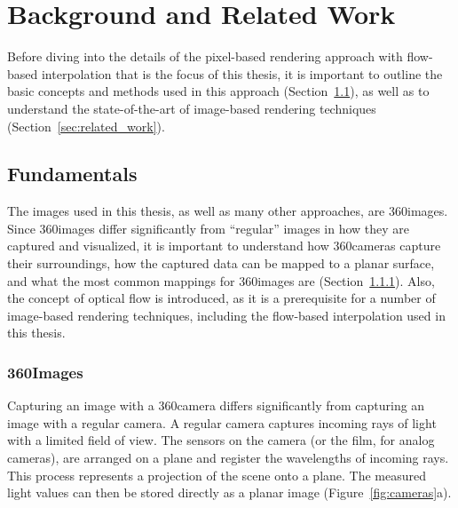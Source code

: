 \chapter{Background and Related Work}
Before diving into the details of the pixel-based rendering approach with flow-based interpolation that is the focus of this thesis, it is important to outline the basic concepts and methods used in this approach (Section~\ref{sec:fundamentals}), as well as to understand the state-of-the-art of image-based rendering techniques (Section~\ref{sec:related_work}).

\section{Fundamentals}\label{sec:fundamentals}
The images used in this thesis, as well as many other approaches, are 360\degree images. Since 360\degree images differ significantly from ``regular'' images in how they are captured and visualized, it is important to understand how 360\degree cameras capture their surroundings, how the captured data can be mapped to a planar surface, and what the most common mappings for 360\degree images are (Section~\ref{subsec:fundamentals_360}). Also, the concept of optical flow is introduced, as it is a prerequisite for a number of image-based rendering techniques, including the flow-based interpolation used in this thesis.

\subsection{360\degree Images}\label{subsec:fundamentals_360}
Capturing an image with a 360\degree camera differs significantly from capturing an image with a regular camera. A regular camera captures incoming rays of light with a limited field of view. The sensors on the camera (or the film, for analog cameras), are arranged on a plane and register the wavelengths of incoming rays. This process represents a projection of the scene onto a plane. The measured light values can then be stored directly as a planar image (Figure~\ref{fig:cameras}a).


